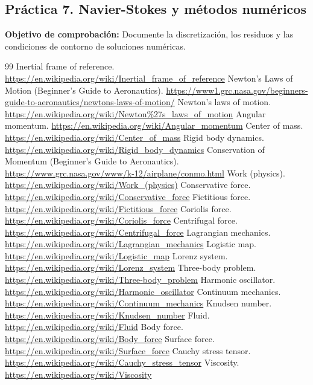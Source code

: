 \documentclass[10pt,openany]{book}
\begin{document}
\subsection*{Práctica 7. Navier-Stokes y métodos numéricos}
\noindent \textbf{Objetivo de comprobación:} Documente la discretización, los residuos y las condiciones de contorno de soluciones numéricas.
\backmatter
\begin{thebibliography}{99}
 Inertial frame of reference. \url{https://en.wikipedia.org/wiki/Inertial_frame_of_reference}
 Newton's Laws of Motion (Beginner's Guide to Aeronautics). \url{https://www1.grc.nasa.gov/beginners-guide-to-aeronautics/newtons-laws-of-motion/}
 Newton's laws of motion. \url{https://en.wikipedia.org/wiki/Newton%27s_laws_of_motion}
 Angular momentum. \url{https://en.wikipedia.org/wiki/Angular_momentum}
 Center of mass. \url{https://en.wikipedia.org/wiki/Center_of_mass}
 Rigid body dynamics. \url{https://en.wikipedia.org/wiki/Rigid_body_dynamics}
 Conservation of Momentum (Beginner's Guide to Aeronautics). \url{https://www.grc.nasa.gov/www/k-12/airplane/conmo.html}
 Work (physics). \url{https://en.wikipedia.org/wiki/Work_(physics)}
 Conservative force. \url{https://en.wikipedia.org/wiki/Conservative_force}
 Fictitious force. \url{https://en.wikipedia.org/wiki/Fictitious_force}
 Coriolis force. \url{https://en.wikipedia.org/wiki/Coriolis_force}
 Centrifugal force. \url{https://en.wikipedia.org/wiki/Centrifugal_force}
 Lagrangian mechanics. \url{https://en.wikipedia.org/wiki/Lagrangian_mechanics}
 Logistic map. \url{https://en.wikipedia.org/wiki/Logistic_map}
 Lorenz system. \url{https://en.wikipedia.org/wiki/Lorenz_system}
 Three-body problem. \url{https://en.wikipedia.org/wiki/Three-body_problem}
 Harmonic oscillator. \url{https://en.wikipedia.org/wiki/Harmonic_oscillator}
 Continuum mechanics. \url{https://en.wikipedia.org/wiki/Continuum_mechanics}
 Knudsen number. \url{https://en.wikipedia.org/wiki/Knudsen_number}
 Fluid. \url{https://en.wikipedia.org/wiki/Fluid}
 Body force. \url{https://en.wikipedia.org/wiki/Body_force}
 Surface force. \url{https://en.wikipedia.org/wiki/Surface_force}
 Cauchy stress tensor. \url{https://en.wikipedia.org/wiki/Cauchy_stress_tensor}
 Viscosity. \url{https://en.wikipedia.org/wiki/Viscosity}

\end{thebibliography}
\end{document}
